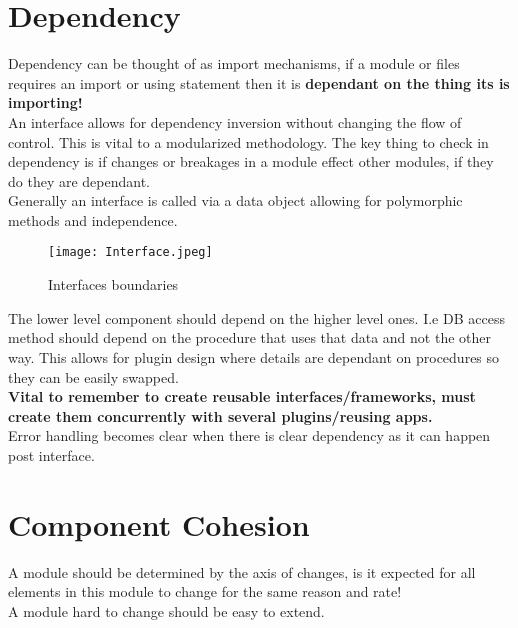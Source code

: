 \documentclass[11pt]{scrartcl} %
\begin{document}
\section{Dependency}

Dependency can be thought of as import mechanisms, if a module or files requires an import or using
statement then it is \textbf{dependant on the thing its is importing!}\\

An interface allows for dependency inversion without changing the flow of control. This is vital
to a modularized methodology. The key thing to check in dependency is if changes or breakages
 in a module effect other modules, if they do they are dependant.\\

Generally an interface is called via a data object allowing for polymorphic methods and independence.\\

\begin{figure}[h] %
	\centering
	\texttt{[image: Interface.jpeg]} %
	\caption{Interfaces boundaries}
\end{figure}

The lower level component should depend on the higher level ones. I.e DB access method should depend 
on the procedure that uses that data and not the other way. This allows for plugin design where details
are dependant on procedures so they can be easily swapped.\\

\textbf{Vital to remember to create reusable interfaces/frameworks, must create them concurrently with several plugins/reusing apps.}\\

Error handling becomes clear when there is clear dependency as it can happen post interface.

\section{Component Cohesion}

A module should be determined by the axis of changes, is it expected for all elements
in this module to change for the same reason and rate!\\

A module hard to change should be easy to extend.
\end{document}
